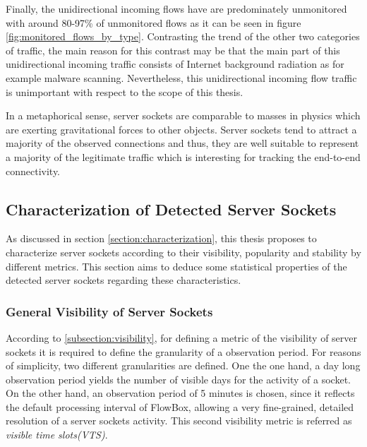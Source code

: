 Finally, the unidirectional incoming flows have are predominately unmonitored with around 80-97\% of unmonitored flows as it can be seen in figure \ref{fig:monitored_flows_by_type}. Contrasting the trend of the other two categories of traffic, the main reason for this contrast may be that the main part of this unidirectional incoming traffic consists of Internet background radiation \citep{Wustrow10,Pang04} as for example malware scanning. Nevertheless, this unidirectional incoming flow traffic is unimportant with respect to the scope of this thesis.

In a metaphorical sense, server sockets are comparable to masses in physics which are exerting gravitational forces to other objects. Server sockets tend to attract a majority of the observed connections and thus, they are well suitable to represent a majority of the legitimate traffic which is interesting for tracking the end-to-end connectivity.


\newpage
\subsection{Characterization of Detected Server Sockets}

As discussed in section \ref{section:characterization}, this thesis proposes to characterize server sockets according to their visibility, popularity and stability by different metrics. This section aims to deduce some statistical properties of the detected server sockets regarding these characteristics.

\subsubsection{General Visibility of Server Sockets}

According to \ref{subsection:visibility}, for defining a metric of the visibility of server sockets it is required to define the granularity of a observation period. For reasons of simplicity, two different granularities are defined. One the one hand, a day long observation period yields the number of visible days for the activity of a socket. On the other hand, an observation period of 5 minutes is chosen, since it reflects the default processing interval of FlowBox, allowing a very fine-grained, detailed resolution of a server sockets activity. This second visibility metric is referred as \emph{visible time slots(VTS)}.

